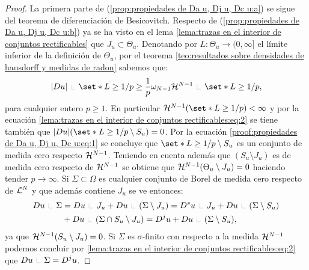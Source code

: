 \documentclass[a4paper,11pt,spanish, twoside, leqno]{tfm-uam}
\begin{document}
\begin{proof}
La primera parte de (\ref{prop:propiedades de Da u, Dj u, Dc u:a}) se sigue del teorema de diferenciación de Besicovitch. Respecto de (\ref{prop:propiedades de Da u, Dj u, Dc u:b}) ya se ha visto en el lema \ref{lema:trazas en el interior de conjuntos rectificables} que $J_{u}\subset \Theta_{u}$. Denotando por $L:\Theta_{u} \to (0,\infty]$ el límite inferior de la definición de $\Theta_{u}$, por el teorema \ref{teo:resultados sobre densidades de hausdorff y medidas de radon} sabemos que:
\begin{align}\label{proof:propiedades de Da u, Dj u, Dc u:eq:1}
\abs{Du}\Radot \set*{L\geq 1/p}\geq \dfrac{1}{p}\omega_{N-1}\Hm{N-1}\Radot\set*{L\geq 1/p},
\end{align}
para cualquier entero $p\geq 1$. En particular $\Hm{N-1}(\set*{L\geq 1/p})<\infty$ y por la ecuación \ref{lema:trazas en el interior de conjuntos rectificables:eq:2} se tiene también que $\abs{Du}(\set*{L\geq 1/p}\setminus S_{u})=0$. Por la ecuación \ref{proof:propiedades de Da u, Dj u, Dc u:eq:1} se concluye que $\set*{L\geq 1/p}\setminus S_{u}$ es un conjunto de medida cero respecto $\mathcal{H}^{N-1}$. Teniendo en cuenta además que $(S_{u}\setminus J_{u})$ es de medida cero respecto de $\mathcal{H}^{N-1}$ se obtiene que $\mathcal{H}^{N-1}(\Theta_{u}\setminus J_{u})=0$ haciendo tender $p\to \infty$. Si $\Sigma\subset \Omega$ es cualquier conjunto de Borel de medida cero respecto de $\mathcal{L}^{N}$ y que además contiene $J_{u}$ se ve entonces:
\begin{align*}
Du\Radot \Sigma &= Du\Radot J_{u}+Du \Radot (\Sigma\setminus J_{u})=D^{s}u\Radot J_{u}+Du\Radot (\Sigma\setminus S_{u})
\\&+Du\Radot (\Sigma \cap S_{u}\setminus J_{u})=D^{j}u+Du\Radot (\Sigma\setminus S_{u}),
\end{align*}
ya que $\mathcal{H}^{N-1}(S_{u}\setminus J_{u})=0$. Si $\Sigma$ es $\sigma$-finito con respecto a la medida $\mathcal{H}^{N-1}$ podemos concluir por \ref{lema:trazas en el interior de conjuntos rectificables:eq:2} que $Du\Radot \Sigma=D^{j}u$.


\end{proof}
\end{document}
